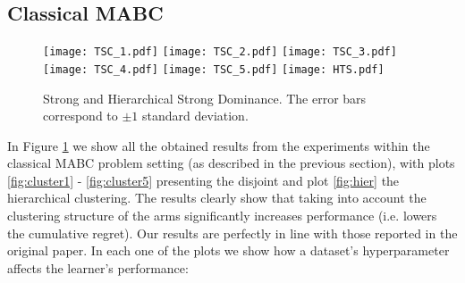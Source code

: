 \subsection{Classical MABC}

\begin{figure}[t]
    \texttt{[image: TSC\_1.pdf]}
    \label{fig:cluster1}
  \endminipage \hfill
    \texttt{[image: TSC\_2.pdf]}
    \label{fig:cluster2}
  \endminipage \hfill
    \texttt{[image: TSC\_3.pdf]}
    \label{fig:cluster3}
  \endminipage
  \vfill
    \texttt{[image: TSC\_4.pdf]}
    \label{fig:cluster4}
  \endminipage \hfill
    \texttt{[image: TSC\_5.pdf]}
    \label{fig:cluster5}
  \endminipage \hfill
    \texttt{[image: HTS.pdf]}
    \label{fig:hier}
  \endminipage
  \caption{Strong and Hierarchical Strong Dominance. The error bars correspond to $\pm 1$ standard deviation.}
  \label{fig:exp1}
\end{figure}

In Figure \ref{fig:exp1} we show all the obtained results from the experiments within the classical MABC problem setting (as described in the previous section), with plots \ref{fig:cluster1} - \ref{fig:cluster5} presenting the disjoint and plot \ref{fig:hier} the hierarchical clustering. The results clearly show that taking into account the clustering structure of the arms significantly increases performance (i.e. lowers the cumulative regret). Our results are perfectly in line with those reported in the original paper. In each one of the plots we show how a dataset's hyperparameter affects the learner's performance:

